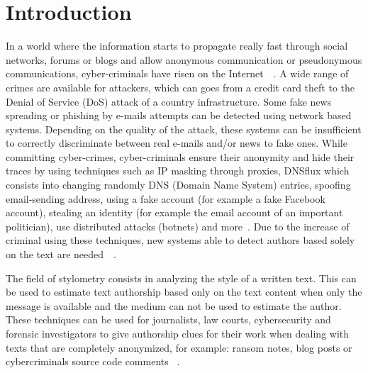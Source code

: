 
\chapter{Introduction \label{sec:introduction}}

In a world where the information starts to propagate really fast through social networks, forums or blogs and allow anonymous communication or pseudonymous communications, cyber-criminals have risen on the Internet~\cite{automated_unsupervised}~\cite{kocher_pan16}.
A wide range of crimes are available for attackers, which can goes from a credit card theft to the Denial of Service (DoS) attack of a country infrastructure.
Some fake news spreading or phishing by e-mails attempts can be detected using network based systems.
Depending on the quality of the attack, these systems can be insufficient to correctly discriminate between real e-mails and/or news to fake ones.
While committing cyber-crimes, cyber-criminals ensure their anonymity and hide their traces by using techniques such as IP masking through proxies, DNSflux which consists into changing randomly DNS (Domain Name System) entries, spoofing email-sending address, using a fake account (for example a fake Facebook account), stealing an identity (for example the email account of an important politician), use distributed attacks (botnets) and more~\cite{attribution_in_cyberspace}.
Due to the increase of criminal using these techniques, new systems able to detect authors based solely on the text are needed~\cite{automated_unsupervised}~\cite{unine_pan20_fake_news}.

The field of stylometry consists in analyzing the style of a written text.
This can be used to estimate text authorship based only on the text content when only the message is available and the medium can not be used to estimate the author.
These techniques can be used for journalists, law courts, cybersecurity and forensic investigators to give authorship clues for their work when dealing with texts that are completely anonymized, for example: ransom notes, blog posts or cybercriminals source code comments ~\cite{pan16_clustering_site}.

